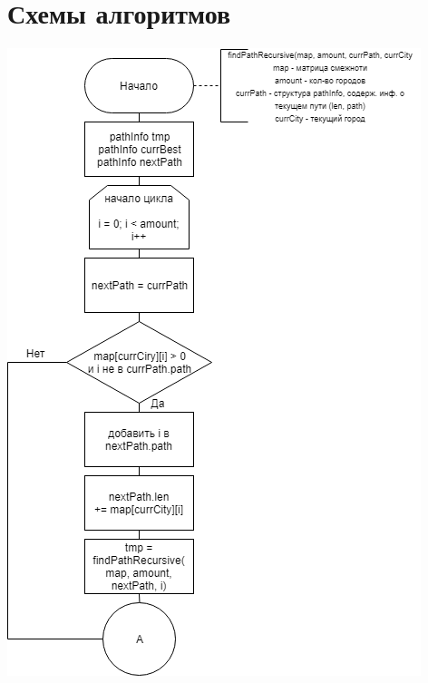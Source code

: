 \documentclass[12pt]{report}
\begin{document}
	\section{Схемы алгоритмов}
	\begin{center}
		\includegraphics[scale=0.7]{Rec1.png}
		

\end{center}
\end{document}
